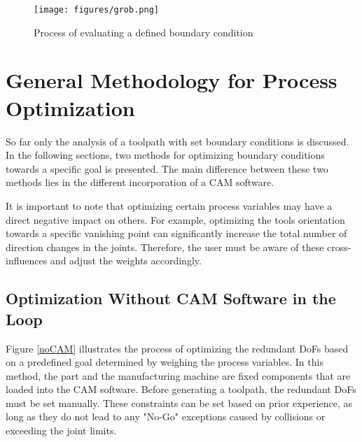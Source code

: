 \begin{figure}[H]
	\centerline{\texttt{[image: figures/grob.png]}}
	\caption{Process of evaluating a defined boundary condition}
	\label{grob}
\end{figure}


\newpage
\section{General Methodology for Process Optimization}
So far only the analysis of a toolpath with set boundary conditions is discussed. In the following sections, two methods for optimizing boundary conditions towards a specific goal is presented. The main difference between these two methods lies in the different incorporation of a \acrshort{CAM} software.

It is important to note that optimizing certain process variables may have a direct negative impact on others. For example, optimizing the tools orientation towards a specific vanishing point can significantly increase the total number of direction changes in the joints. Therefore, the user must be aware of these cross-influences and adjust the weights accordingly.

\subsection{Optimization Without CAM Software in the Loop}\label{noCAMchap}

Figure \ref{noCAM} illustrates the process of optimizing the redundant \acrshort{DoF}s based on a predefined goal determined by weighing the process variables. In this method, the part and the manufacturing machine are fixed components that are loaded into the \acrshort{CAM} software. Before generating a toolpath, the redundant \acrshort{DoF}s must be set manually. These constraints can be set based on prior experience, as long as they do not lead to any "No-Go" exceptions caused by collisions or exceeding the joint limits.

